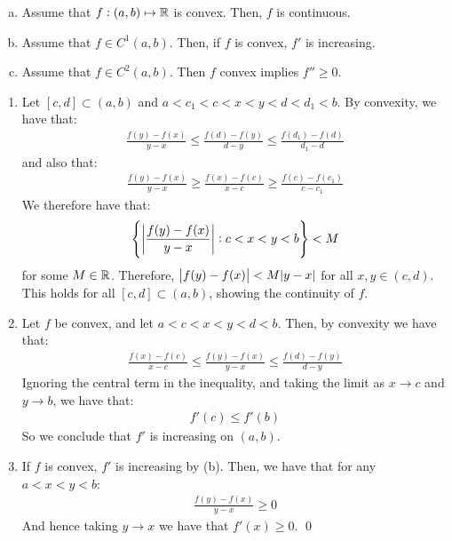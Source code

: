 \begin{ntheorem}{}{}
    \begin{enumerate}[(a)]
        \item Assume that $f: (a, b) \mapsto \mathbb{R}$ is convex. Then, $f$ is continuous.
        \item Assume that $f \in C^1(a, b)$. Then, if $f$ is convex, $f'$ is increasing.
        \item Assume that $f \in C^2(a, b)$. Then $f$ convex implies $f'' \geq 0$. 
    \end{enumerate}
\end{ntheorem}
\begin{nproof}
    \begin{enumerate}
        \item Let $[c, d] \subset (a, b)$ and $a < c_1 < c < x < y < d < d_1 < b$. By convexity, we have that:
        \begin{align*}
            \frac{f(y) - f(x)}{y - x} \leq \frac{f(d) - f(y)}{d - y} \leq \frac{f(d_1) - f(d)}{d_1 - d}
        \end{align*}
        and also that:
        \begin{align*}
            \frac{f(y) - f(x)}{y - x} \geq \frac{f(x) - f(c)}{x - c} \geq \frac{f(c) - f(c_1)}{c - c_1}
        \end{align*}
        We therefore have that:
        \begin{align*}
            \set{\abs{\frac{f(y) - f(x)}{y - x}}: c < x < y < b} < M
        \end{align*}
        for some $M \in \mathbb{R}$. Therefore, $\abs{f(y) - f(x)} < M\abs{y - x}$ for all $x, y \in (c, d)$. This holds for all $[c, d] \subset (a, b)$, showing the continuity of $f$.
        \item Let $f$ be convex, and let $a < c < x < y < d < b$. Then, by convexity we have that:
        \begin{align*}
            \frac{f(x) - f(c)}{x - c} \leq \frac{f(y) - f(x)}{y - x} \leq \frac{f(d) - f(y)}{d - y}
        \end{align*}
        Ignoring the central term in the inequality, and taking the limit as $x \rightarrow c$ and $ y \rightarrow b$, we have that:
        \begin{align*}
            f'(c) \leq f'(b)
        \end{align*}
        So we conclude that $f'$ is increasing on $(a, b)$. 
        \item If $f$ is convex, $f'$ is increasing by (b). Then, we have that for any $a < x < y < b$:
        \begin{align*}
            \frac{f(y) - f(x)}{y - x} \geq 0
        \end{align*}
        And hence taking $y \rightarrow x$ we have that $f'(x) \geq 0$. \qed
    \end{enumerate}
\end{nproof}

